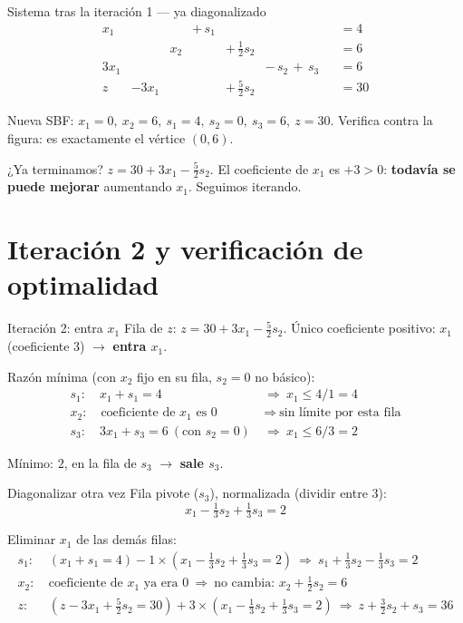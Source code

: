 \documentclass[aspectratio=169]{beamer}
\begin{document}
\begin{frame}{Sistema tras la iteración 1 --- ya diagonalizado}
\[
\begin{aligned}
x_1 &&&+\, s_1 &&&&= 4\\
&& x_2 &&+\,\tfrac12 s_2 &&&= 6\\
3x_1 &&& &&-\,s_2\,+\,s_3 &&= 6\\
\hline
z &-3x_1 & & &+\,\tfrac52 s_2 & && = 30
\end{aligned}
\]

Nueva SBF: $x_1=0,\ x_2=6,\ s_1=4,\ s_2=0,\ s_3=6,\ z=30$. Verifica contra la figura: es exactamente el vértice $(0,6)$.
\par\medskip
\begin{block}{¿Ya terminamos?}
$z = 30 + 3x_1 - \tfrac52 s_2$. El coeficiente de $x_1$ es $+3>0$: \textbf{todavía se puede mejorar} aumentando $x_1$. Seguimos iterando.
\end{block}
\end{frame}

\section{Iteración 2 y verificación de optimalidad}

\begin{frame}{Iteración 2: entra $x_1$}
Fila de $z$: $z = 30 + 3x_1 - \tfrac52 s_2$. Único coeficiente positivo: $x_1$ (coeficiente $3$) $\to$ \textbf{entra $x_1$}.

Razón mínima (con $x_2$ fijo en su fila, $s_2=0$ no básico):
\[
\begin{aligned}
s_1: \quad x_1 + s_1 = 4 &\ \Rightarrow\ x_1 \leq 4/1 = 4\\
x_2: \quad \text{coeficiente de $x_1$ es } 0 &\ \Rightarrow\ \text{sin límite por esta fila}\\
s_3: \quad 3x_1 + s_3 = 6\ (\text{con } s_2{=}0) &\ \Rightarrow\ x_1 \leq 6/3 = 2
\end{aligned}
\]

Mínimo: $2$, en la fila de $s_3$ $\to$ \textbf{sale $s_3$}.
\end{frame}

\begin{frame}{Diagonalizar otra vez}
Fila pivote ($s_3$), normalizada (dividir entre $3$):
\[
x_1 - \tfrac13 s_2 + \tfrac13 s_3 = 2
\]

Eliminar $x_1$ de las demás filas:
\[
\begin{aligned}
s_1:\ & (x_1+s_1=4) - 1\times(x_1-\tfrac13 s_2+\tfrac13 s_3=2) \ \Rightarrow\ s_1 + \tfrac13 s_2 - \tfrac13 s_3 = 2\\[2pt]
x_2:\ & \text{coeficiente de $x_1$ ya era 0} \ \Rightarrow\ \text{no cambia: } x_2 + \tfrac12 s_2 = 6\\[2pt]
z:\ & (z-3x_1+\tfrac52 s_2=30) + 3\times(x_1-\tfrac13 s_2+\tfrac13 s_3=2) \ \Rightarrow\ z + \tfrac32 s_2 + s_3 = 36
\end{aligned}
\]
\end{frame}
\end{document}
